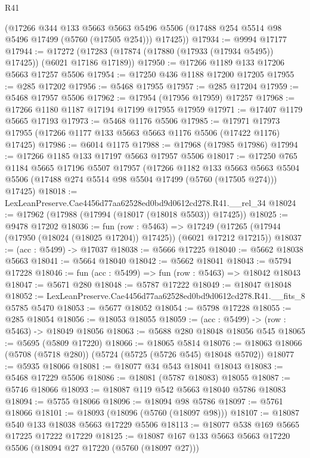 \begin{lexlean}{R41}
\begin{coremodule}
      (@17266
        @344
        @133
        @5663
        @5663
        @5496
        @5506
        (@17488 @254 @5514 @98 @5496 @17499 (@5760 (@17505 @254)))
        @17425))
@17934 := @9994 @17177
@17944 := @17272 (@17283 (@17874 (@17880 (@17933 (@17934 @5495)) @17425)) (@6021 @17186 @17189))
@17950 := @17266 @1189 @133 @17206 @5663 @17257 @5506
@17954 := @17250 @436 @1188 @17200 @17205
@17955 := @285 @17202
@17956 := @5468 @17955
@17957 := @285 @17204
@17959 := @5468 @17957 @5506
@17962 := @17954 (@17956 @17959) @17257
@17968 := @17266 @1180 @1187 @17194 @17199 @17955 @17959
@17971 := @17407 @1179 @5665 @17193
@17973 := @5468 @1176 @5506
@17985 := @17971 @17973 @17955 (@17266 @1177 @133 @5663 @5663 @1176 @5506 (@17422 @1176) @17425)
@17986 := @6014 @1175
@17988 := @17968 (@17985 @17986)
@17994 := @17266 @1185 @133 @17197 @5663 @17957 @5506
@18017 := @17250
    @765
    @1184
    @5665
    @17196
    @5507
    @17957
    (@17266
      @1182
      @133
      @5663
      @5663
      @5504
      @5506
      (@17488 @274 @5514 @98 @5504 @17499 (@5760 (@17505 @274)))
      @17425)
@18018 := LexLeanPreserve.Cae4456d77aa62528ed0bd9d0612cd278.R41.__rel_34
@18024 := @17962 (@17988 (@17994 (@18017 (@18018 @5503)) @17425))
@18025 := @9478 @17202
@18036 := fun (row : @5463) =>
  @17249 (@17265 (@17944 (@17950 (@18024 (@18025 @17204)) @17425)) (@6021 @17212 @17215))
@18037 := (acc : @5499) -> @17037
@18038 := @5666 @17225
@18040 := @5662 @18038 @5663
@18041 := @5664 @18040
@18042 := @5662 @18041
@18043 := @5794 @17228
@18046 := fun (acc : @5499) => fun (row : @5463) => @18042 @18043
@18047 := @5671 @280
@18048 := @5787 @17222
@18049 := @18047 @18048
@18052 := LexLeanPreserve.Cae4456d77aa62528ed0bd9d0612cd278.R41.__fits_8 @5785 @5470
@18053 := @5677 @18052
@18054 := @5798 @17228
@18055 := @285 @18054
@18056 := @18053 @18055
@18059 := (acc : @5499) -> (row : @5463) -> @18049 @18056
@18063 := @5688 @280 @18048 @18056 @545
@18065 := @5695 (@5809 @17220)
@18066 := @18065 @5814
@18076 := @18063 @18066 (@5708 (@5718 @280)) (@5724 (@5725 (@5726 @545) @18048 @5702))
@18077 := @5935 @18066
@18081 := @18077 @34 @543 @18041 @18043
@18083 := @5468 @17229 @5506
@18086 := @18081 (@5787 @18083) @18055
@18087 := @5746 @18066
@18093 := @18087 @119 @542 @5663 @18040 @5786 @18083
@18094 := @5755 @18066
@18096 := @18094 @98 @5786
@18097 := @5761 @18066
@18101 := @18093 (@18096 (@5760 (@18097 @98)))
@18107 := @18087 @540 @133 @18038 @5663 @17229 @5506
@18113 := @18077 @538 @169 @5665 @17225 @17222 @17229
@18125 := @18087 @167 @133 @5663 @5663 @17220 @5506 (@18094 @27 @17220 (@5760 (@18097 @27)))

\end{coremodule}
\end{lexlean}
